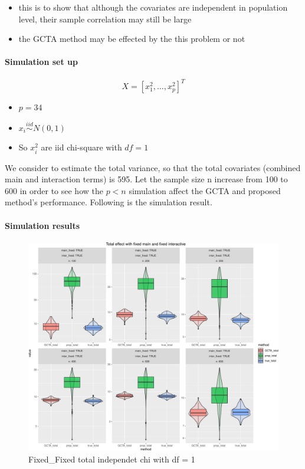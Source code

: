 \documentclass[]{article}
\providecommand{\tightlist}{%
  \setlength{\itemsep}{0pt}\setlength{\parskip}{0pt}}
\let\oldparagraph\paragraph
\renewcommand{\paragraph}[1]{\oldparagraph{#1}\mbox{}}
\begin{document}
\begin{itemize}
\tightlist
\item
  this is to show that although the covariates are independent in
  population level, their sample correlation may still be large
\item
  the GCTA method may be effected by the this problem or not
\end{itemize}

\paragraph{Simulation set up}\label{simulation-set-up}

\[
  X = [x_1^2, \dots, x_p^2]^T
\]

\begin{itemize}
\tightlist
\item
  \(p = 34\)\\
\item
  \(x_i \stackrel{iid}{\sim} N(0,1)\)\\
\item
  So \(x_i^2\) are iid chi-square with \(df = 1\)
\end{itemize}

We consider to estimate the total variance, so that the total covariates
(combined main and interaction terms) is 595. Let the sample size n
increase from 100 to 600 in order to see how the \(p < n\) simulation
affect the GCTA and proposed method's performance. Following is the
simulation result.

\paragraph{Simulation results}\label{simulation-results}

\begin{figure}
\centering
\includegraphics{Decorrelation_method_and_their_effect_on_proposed_method_files/figure-latex/fixed_fixed-1.pdf}
\caption{Fixed\_Fixed total independet chi with df = 1}
\end{figure}
\end{document}
